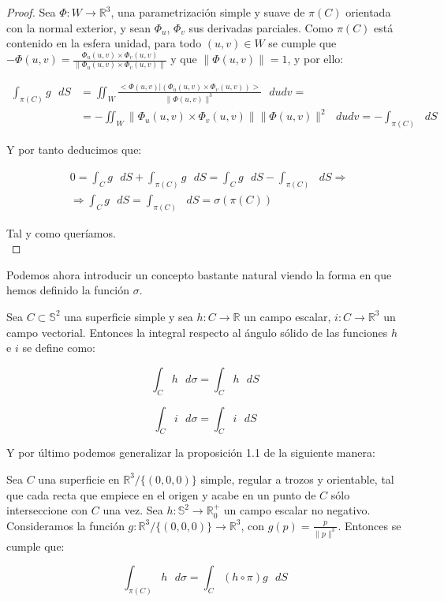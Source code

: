 \begin{proof}
Sea $\Phi :W\rightarrow \mathds{R}^3$, una parametrización simple y suave de $\pi (C)$ orientada con la normal exterior, y sean $\Phi _u$, $\Phi _v$ sus derivadas parciales. Como $\pi (C)$ está contenido en la esfera unidad, para todo $(u,v)\in W$ se cumple que $-\Phi(u,v) = \frac{\Phi_u(u,v)\times \Phi_v (u,v)}{\|\Phi_u(u,v)\times \Phi_v (u,v)\|}$ y que  $\|\Phi(u,v)\| = 1$, y por ello:

\begin{align*}
  \int _{\pi(C)}g\text{ } dS &= \iint _{W} \frac{<\Phi(u,v) | (\Phi_u(u,v)\times \Phi_v (u,v))>}{\|\Phi(u,v)\|^3}\text{ } du dv =\\
  &= - \iint _{W} \|\Phi_u(u,v)\times \Phi_v (u,v)\| \|\Phi(u,v)\|^2\text{ } du dv = - \int _{\pi(C)}\text{ } dS
\end{align*}

Y por tanto deducimos que:

\begin{align*}
  & 0 = \int _{C}g\text{ } dS + \int _{\pi(C)}g\text{ } dS = \int _{C}g\text{ } dS - \int _{\pi(C)}\text{ } dS \Rightarrow \\
  & \Rightarrow \int _{C}g\text{ } dS = \int _{\pi(C)}\text{ } dS = \sigma (\pi(C))
\end{align*}

Tal y como queríamos.\\
\end{proof}

Podemos ahora introducir un concepto bastante natural viendo la forma en que hemos definido la función $\sigma$.

\begin{definicion}
  Sea $C\subset \mathds{S}^2$ una superficie simple y sea $h: C\rightarrow \mathds{R}$ un campo escalar, $i: C\rightarrow \mathds{R}^3$ un campo vectorial. Entonces la integral respecto al ángulo sólido de las funciones $h$ e $i$ se define como:

  $$\int _C h\text{ } d\sigma = \int _C h\text{ } dS$$

   $$\int _C i\text{ } d\sigma = \int _C i\text{ } dS$$
  
\end{definicion}

Y por último podemos generalizar la proposición 1.1 de la siguiente manera:

\begin{proposicion}
  
Sea $C$ una superficie en $\mathds{R}^3/\{(0,0,0)\}$ simple, regular a trozos y orientable, tal que cada recta que empiece en el origen y acabe en un punto de $C$ sólo interseccione con $C$ una vez. Sea $h: \mathds{S}^2\rightarrow \mathds{R}^+_0$ un campo escalar no negativo. Consideramos la función $g:\mathds{R}^3/\{(0,0,0)\} \rightarrow \mathds{R}^3$, con $g(p)=\frac{p}{\|p\|^3}$. Entonces se cumple que:

 \begin{equation}
   \int_{\pi(C)} h\text{ }d\sigma = \int _C (h\circ \pi) g \text{ }dS 
 \end{equation}
 
  \end{proposicion}

